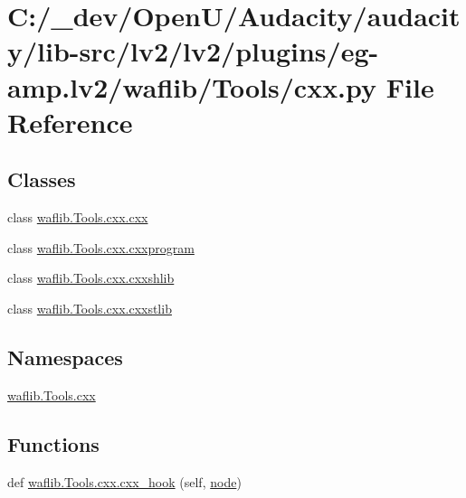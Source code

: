 \hypertarget{lv2_2plugins_2eg-amp_8lv2_2waflib_2_tools_2cxx_8py}{}\section{C\+:/\+\_\+dev/\+Open\+U/\+Audacity/audacity/lib-\/src/lv2/lv2/plugins/eg-\/amp.lv2/waflib/\+Tools/cxx.py File Reference}
\label{lv2_2plugins_2eg-amp_8lv2_2waflib_2_tools_2cxx_8py}
\subsection*{Classes}
\begin{DoxyCompactItemize}
\item 
class \hyperlink{classwaflib_1_1_tools_1_1cxx_1_1cxx}{waflib.\+Tools.\+cxx.\+cxx}
\item 
class \hyperlink{classwaflib_1_1_tools_1_1cxx_1_1cxxprogram}{waflib.\+Tools.\+cxx.\+cxxprogram}
\item 
class \hyperlink{classwaflib_1_1_tools_1_1cxx_1_1cxxshlib}{waflib.\+Tools.\+cxx.\+cxxshlib}
\item 
class \hyperlink{classwaflib_1_1_tools_1_1cxx_1_1cxxstlib}{waflib.\+Tools.\+cxx.\+cxxstlib}
\end{DoxyCompactItemize}
\subsection*{Namespaces}
\begin{DoxyCompactItemize}
\item 
 \hyperlink{namespacewaflib_1_1_tools_1_1cxx}{waflib.\+Tools.\+cxx}
\end{DoxyCompactItemize}
\subsection*{Functions}
\begin{DoxyCompactItemize}
\item 
def \hyperlink{namespacewaflib_1_1_tools_1_1cxx_a31f0414cdfdb6dd749e0f65f788bfbda}{waflib.\+Tools.\+cxx.\+cxx\+\_\+hook} (self, \hyperlink{structnode}{node})
\end{DoxyCompactItemize}
